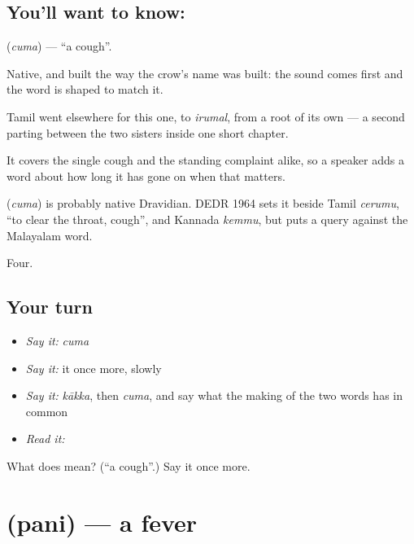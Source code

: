 \subsection*{You'll want to know: }
\textbf{} (\emph{cuma}) — \textquotedblleft{}a cough\textquotedblright{}.

Native, and built the way the crow's name was built: the sound comes first and the word is shaped to match it.

Tamil went elsewhere for this one, to \emph{irumal}, from a root of its own — a second parting between the two sisters inside one short chapter.

It covers the single cough and the standing complaint alike, so a speaker adds a word about how long it has gone on when that matters.

\begin{cousinweb}
\textbf{} (\emph{cuma}) is probably native Dravidian. DEDR 1964 sets it beside Tamil \emph{cerumu}, \textquotedblleft{}to clear the throat, cough\textquotedblright{}, and Kannada \emph{kemmu}, but puts a query against the Malayalam word.
\end{cousinweb}

\begin{grammarlens}[title={What you've built}]
Four.
\end{grammarlens}

\subsection*{Your turn}
\begin{itemize}
\raggedright
  \item \emph{Say it:} \emph{cuma}
  \item \emph{Say it:} it once more, slowly
  \item \emph{Say it:} \emph{kākka}, then \emph{cuma}, and say what the making of the two words has in common
  \item \emph{Read it:} \textbf{}
\end{itemize}

\begin{tcolorbox}[breakable,colback=teal!4,colframe=teal!35!black,title={Before you move on}]
What does  mean? (\textquotedblleft{}a cough\textquotedblright{}.) Say it once more.
\end{tcolorbox}
\section[\texorpdfstring{\ml{പനി} (pani)}{പനി (pani)}]{ (pani) — a fever}

